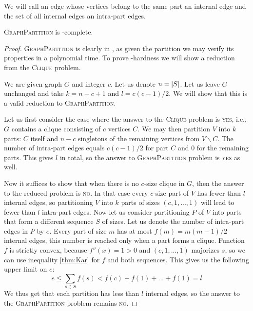 We will call an edge whose vertices belong to the same part an internal edge
and the set of all internal edges an intra-part edges.

\begin{thm} \label{gp-np}
\textsc{GraphPartition} is \np-complete.
\end{thm}

\begin{proof}
\textsc{GraphPartition} is clearly in \np,
as given the partition we may verify its properties in a polynomial time.
To prove \np-hardness we will show a reduction from the \textsc{Clique} problem.

We are given graph $G$ and integer $c$.
Let us denote $n = \left\vert S \right\vert$.
Let us leave $G$ unchanged and take $k = n-c+1$ and $l = c(c-1)/2$.
We will show that this is a valid reduction to \textsc{GraphPartition}.

Let us first consider the case where the answer to the \textsc{Clique} problem is \textsc{yes},
i.e., $G$ contains a clique consisting of $c$ vertices $C$.
We may then partition $V$ into $k$ parts:
$C$ itself and $n-c$ singletons of the remaining vertices from $V \backslash C$.
The number of intra-part edges equals $c(c-1)/2$ for part $C$ and $0$ for the remaining parts.
This gives $l$ in total, so the answer to \textsc{GraphPartition} problem is \textsc{yes} as well.

Now it suffices to show that when there is no $c$-size clique in $G$,
then the answer to the reduced problem is \textsc{no}.
In that case every $c$-size part of $V$ has fewer than $l$ internal edges,
so partitioning $V$ into $k$ parts of sizes $(c, 1, ..., 1)$ will lead to fewer than $l$ intra-part edges.
Now let us consider partitioning $P$ of $V$ into parts that form a different sequence $S$ of sizes.
Let us denote the number of intra-part edges in $P$ by $e$.
Every part of size $m$ has at most $f(m) = m(m-1)/2$ internal edges,
this number is reached only when a part forms a clique.
Function $f$ is strictly convex, because $f''(x) = 1 > 0$ and $(c,1,...,1)$ majorizes $s$,
so we can use inequality \eqref{thm:Kar} for $f$ and both sequences.
This gives us the following upper limit on $e$:
$$e \leq \sum_{s\in{S}} f(s) < f(c) + f(1) + ... + f(1) = l$$
We thus get that each partition has less than $l$ internal edges,
so the answer to the \textsc{GraphPartition} problem remains \textsc{no}.
\end{proof}
